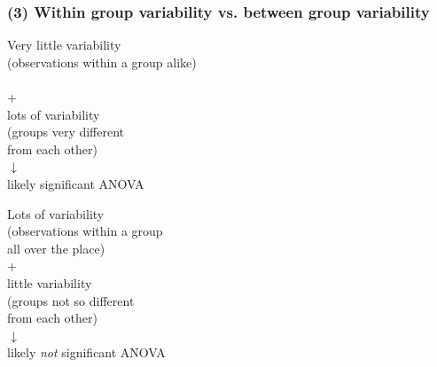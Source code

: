 \documentclass[slidestop,compress,mathserif]{beamer}
\begin{document}
\begin{frame}
\frametitle{(3) Within group variability vs. between group variability}

{
\begin{center}
Very little variability  \\
{\small (observations within a group alike)} \\
$\:$ \\
+ \\
\pause
lots of variability  \\
{\small (groups very different \\
from each other)} \\
$\downarrow$ \\
\pause
likely significant ANOVA
\end{center}
}
{
\begin{center}
\pause
Lots of variability  \\
{\small (observations within a group \\
all over the place)} \\
+ \\
\pause
little variability  \\
{\small (groups not so different \\
from each other)} \\
$\downarrow$ \\
\pause
likely \emph{not} significant ANOVA
\end{center}
}

\end{frame}

\end{document}
